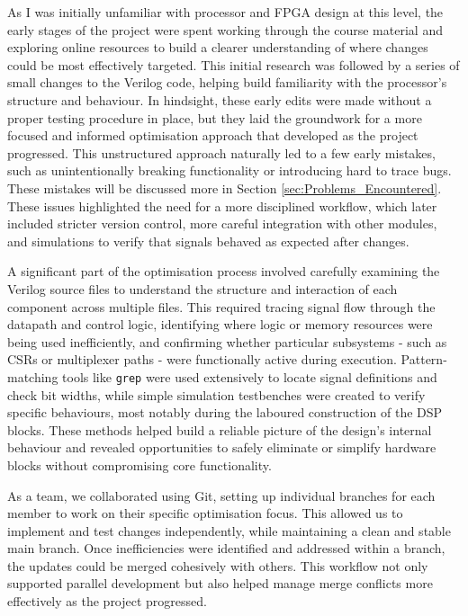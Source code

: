 \documentclass[a4paper,10pt]{article}
\begin{document}
As I was initially unfamiliar with processor and FPGA design at this level, 
the early stages of the project were spent working through the course material 
and exploring online resources to build a clearer understanding of 
where changes could be most effectively targeted. 
This initial research was followed by a series of small 
changes to the Verilog code, 
helping build familiarity with the processor's structure and behaviour.
In hindsight, these early edits were made 
without a proper testing procedure in place, 
but they laid the groundwork for a more focused and informed optimisation approach 
that developed as the project progressed.
This unstructured approach naturally led to a few early mistakes, 
such as unintentionally breaking functionality or introducing hard to trace bugs.
These mistakes will be discussed more in Section \ref{sec:Problems_Encountered}.
These issues highlighted the need for a more disciplined workflow, 
which later included stricter version control, 
more careful integration with other modules, 
and simulations to verify that signals behaved as expected after changes.

A significant part of the optimisation process involved 
carefully examining the Verilog source files to understand 
the structure and interaction of each component
across multiple files. 
This required tracing signal flow through the datapath and control logic, 
identifying where logic or memory resources were being used inefficiently, 
and confirming whether particular subsystems - 
such as CSRs or multiplexer paths - 
were functionally active during execution. 
Pattern-matching tools like \texttt{grep} were used extensively 
to locate signal definitions and check bit widths, 
while simple simulation testbenches were created to verify specific behaviours,
most notably during the laboured construction of the DSP blocks.
These methods helped build a reliable picture of the design's internal behaviour 
and revealed opportunities to safely eliminate or simplify hardware blocks 
without compromising core functionality.

As a team, we collaborated using Git, 
setting up individual branches for each member to work 
on their specific optimisation focus. 
This allowed us to implement and test changes independently,
while maintaining a clean and stable main branch. 
Once inefficiencies were identified and addressed within a branch, 
the updates could be merged cohesively with others. 
This workflow not only supported parallel development 
but also helped manage merge conflicts more effectively as the project progressed.
\end{document}
